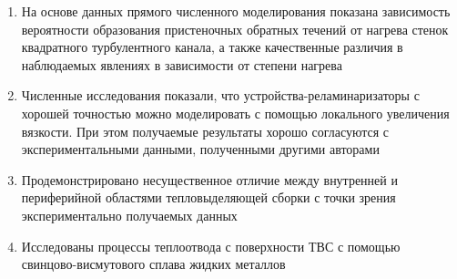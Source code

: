\begin{enumerate}
  \item На основе данных прямого численного моделирования показана зависимость вероятности образования
  пристеночных обратных течений от нагрева стенок квадратного турбулентного канала, а также качественные различия 
  в наблюдаемых явлениях в зависимости от степени нагрева
  \item Численные исследования показали, что устройства-реламинаризаторы с хорошей точностью можно моделировать
  с помощью локального увеличения вязкости. При этом получаемые результаты хорошо согласуются с экспериментальными 
  данными, полученными другими авторами
  \item Продемонстрировано несущественное отличие между внутренней и периферийной областями тепловыделяющей
  сборки с точки зрения экспериментально получаемых данных
  \item Исследованы процессы теплоотвода с поверхности ТВС с помощью свинцово-висмутового сплава жидких металлов
\end{enumerate}
